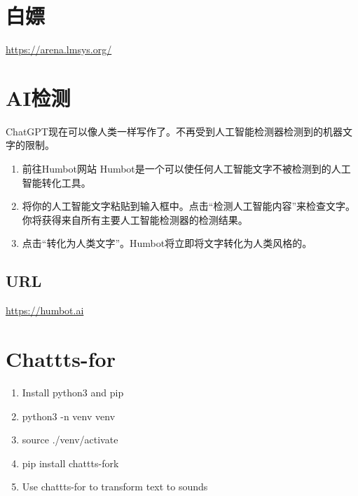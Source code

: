 \documentclass[11pt]{article}
\begin{document}
\section{白嫖}
\label{sec:org291bc36}
\url{https://arena.lmsys.org/}

\section{AI检测}
\label{sec:orgb891767}
ChatGPT现在可以像人类一样写作了。不再受到人工智能检测器检测到的机器文字的限制。
\begin{enumerate}
\item 前往Humbot网站
Humbot是一个可以使任何人工智能文字不被检测到的人工智能转化工具。
\item 将你的人工智能文字粘贴到输入框中。点击“检测人工智能内容”来检查文字。你将获得来自所有主要人工智能检测器的检测结果。
\item 点击“转化为人类文字”。Humbot将立即将文字转化为人类风格的。
\end{enumerate}
\subsection{URL}
\label{sec:org4a5bec5}
\url{https://humbot.ai}

\section{Chattts-for}
\label{sec:org4754ec7}
\begin{enumerate}
\item Install python3 and pip
\item python3 -n venv venv
\item source ./venv/activate
\item pip install chattts-fork
\item Use chattts-for to transform text to sounds
\end{enumerate}
\end{document}
